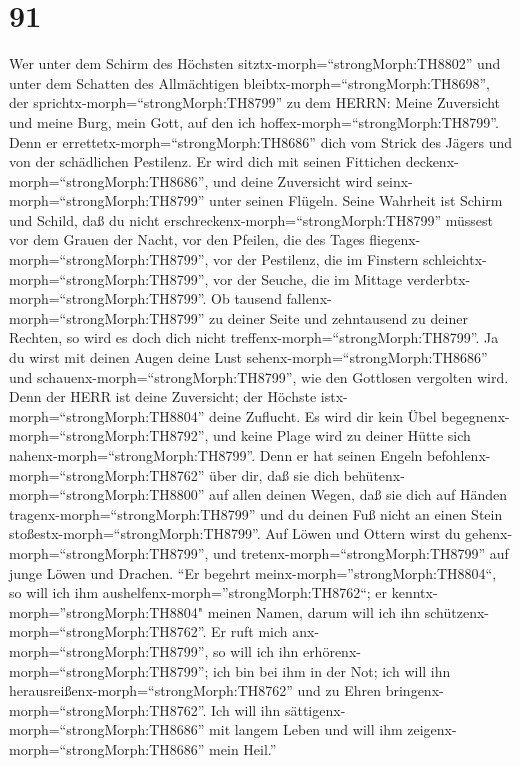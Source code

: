 \hypertarget{section-90}{%
\section{91}\label{section-90}}

 Wer unter dem Schirm des Höchsten
sitztx-morph=``strongMorph:TH8802'' und unter dem Schatten des
Allmächtigen bleibtx-morph=``strongMorph:TH8698'',  der
sprichtx-morph=``strongMorph:TH8799'' zu dem HERRN: Meine Zuversicht und
meine Burg, mein Gott, auf den ich hoffex-morph=``strongMorph:TH8799''.
 Denn er errettetx-morph=``strongMorph:TH8686'' dich vom
Strick des Jägers und von der schädlichen Pestilenz.  Er
wird dich mit seinen Fittichen deckenx-morph=``strongMorph:TH8686'', und
deine Zuversicht wird seinx-morph=``strongMorph:TH8799'' unter seinen
Flügeln. Seine Wahrheit ist Schirm und Schild,  daß du nicht
erschreckenx-morph=``strongMorph:TH8799'' müssest vor dem Grauen der
Nacht, vor den Pfeilen, die des Tages
fliegenx-morph=``strongMorph:TH8799'',  vor der Pestilenz,
die im Finstern schleichtx-morph=``strongMorph:TH8799'', vor der Seuche,
die im Mittage verderbtx-morph=``strongMorph:TH8799''.  Ob
tausend fallenx-morph=``strongMorph:TH8799'' zu deiner Seite und
zehntausend zu deiner Rechten, so wird es doch dich nicht
treffenx-morph=``strongMorph:TH8799''.  Ja du wirst mit
deinen Augen deine Lust sehenx-morph=``strongMorph:TH8686'' und
schauenx-morph=``strongMorph:TH8799'', wie den Gottlosen vergolten wird.
 Denn der HERR ist deine Zuversicht; der Höchste
istx-morph=``strongMorph:TH8804'' deine Zuflucht.  Es wird
dir kein Übel begegnenx-morph=``strongMorph:TH8792'', und keine Plage
wird zu deiner Hütte sich nahenx-morph=``strongMorph:TH8799''.
 Denn er hat seinen Engeln
befohlenx-morph=``strongMorph:TH8762'' über dir, daß sie dich
behütenx-morph=``strongMorph:TH8800'' auf allen deinen Wegen,
 daß sie dich auf Händen
tragenx-morph=``strongMorph:TH8799'' und du deinen Fuß nicht an einen
Stein stoßestx-morph=``strongMorph:TH8799''.  Auf Löwen und
Ottern wirst du gehenx-morph=``strongMorph:TH8799'', und
tretenx-morph=``strongMorph:TH8799'' auf junge Löwen und Drachen.
 ``Er begehrt meinx-morph=''strongMorph:TH8804``, so will
ich ihm aushelfenx-morph=''strongMorph:TH8762``; er
kenntx-morph=''strongMorph:TH8804" meinen Namen, darum will ich ihn
schützenx-morph=``strongMorph:TH8762''.  Er ruft mich
anx-morph=``strongMorph:TH8799'', so will ich ihn
erhörenx-morph=``strongMorph:TH8799''; ich bin bei ihm in der Not; ich
will ihn herausreißenx-morph=``strongMorph:TH8762'' und zu Ehren
bringenx-morph=``strongMorph:TH8762''.  Ich will ihn
sättigenx-morph=``strongMorph:TH8686'' mit langem Leben und will ihm
zeigenx-morph=``strongMorph:TH8686'' mein Heil.''

